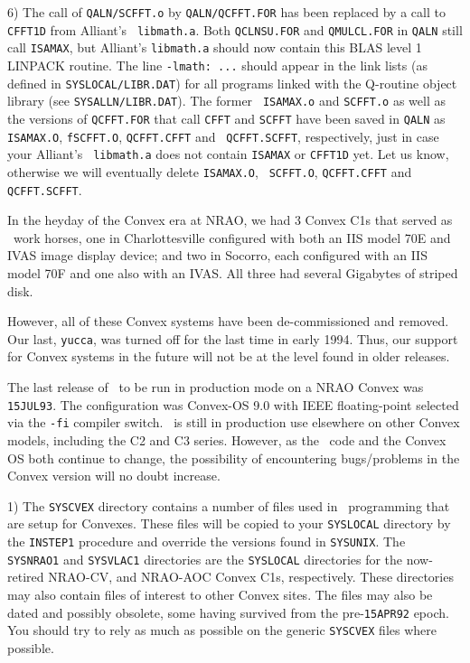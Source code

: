 {\item{6)} The call of {\tt\dol QALN/SCFFT.o} by {\tt\dol QALN/QCFFT.FOR}
has been replaced by a call to {\tt CFFT1D} from Alliant's {\tt
libmath.a}.  Both {\tt QCLNSU.FOR} and {\tt QMULCL.FOR} in {\tt\dol QALN}
still call {\tt ISAMAX}, but Alliant's {\tt libmath.a} should now
contain this BLAS level 1 LINPACK routine.  The line {\tt -lmath: ...}
should appear in the link lists (as defined in
{\tt\dol SYSLOCAL/LIBR.DAT}) for all programs linked with the Q-routine
object library (see {\tt \dol SYSALLN/LIBR.DAT}).  The former {\tt
ISAMAX.o} and {\tt SCFFT.o} as well as the versions of {\tt QCFFT.FOR}
that call {\tt CFFT} and {\tt SCFFT} have been saved in {\tt\dol QALN} as
{\tt ISAMAX.O}, {\tt fSCFFT.O}, {\tt QCFFT.CFFT} and {\tt
QCFFT.SCFFT}, respectively, just in case your Alliant's {\tt
libmath.a} does not contain {\tt ISAMAX} or {\tt CFFT1D} yet. Let us
know, otherwise we will eventually delete {\tt ISAMAX.O}, {\tt
SCFFT.O}, {\tt QCFFT.CFFT} and {\tt QCFFT.SCFFT}.\medskip


In the heyday of the Convex era at NRAO, we had 3 Convex C1s that served
as \AIPS\ work horses, one in Charlottesville configured with both an IIS
model 70E and IVAS image display device; and two in Socorro, each
configured with an IIS model 70F and one also with an IVAS.  All three had
several Gigabytes of striped disk.

However, all of these Convex systems have been de-commissioned and removed.
Our last, {\tt yucca}, was turned off for the last time in early 1994.
Thus, our support for Convex systems in the future will not be at the
level found in older releases.

The last release of \AIPS\ to be run in production mode on a NRAO Convex
was {\tt 15JUL93}.  The configuration was Convex-OS 9.0 with IEEE
floating-point selected via the {\tt -fi} compiler switch.  \AIPS\ is
still in production use elsewhere on other Convex models, including the C2
and C3 series.  However, as the \AIPS\ code and the Convex OS both
continue to change, the possibility of encountering bugs/problems in the
Convex version will no doubt increase.

\item{1)} The {\tt\dol SYSCVEX} directory contains a number of files used
in \AIPS\ programming that are setup for Convexes.  These files will
be copied to your {\tt\dol SYSLOCAL} directory by the {\tt INSTEP1}
procedure and override the versions found in {\tt\dol SYSUNIX}. The {\tt
\dol SYSNRAO1} and {\tt \dol SYSVLAC1} directories are the {\tt\dol SYSLOCAL}
directories for the now-retired NRAO-CV, and NRAO-AOC Convex C1s,
respectively.  These directories may also contain files of interest to
other Convex sites.  The files may also be dated and possibly obsolete,
some having survived from the pre-{\tt 15APR92} epoch.  You should try to
rely as much as possible on the generic {\tt\dol SYSCVEX} files where
possible.

}

